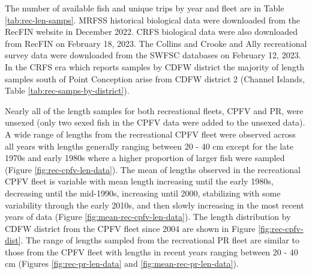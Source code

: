 \documentclass[11pt,
  english,
  letterpaper,
]{article}
\begin{document}
The number of available fish and unique trips by year and fleet are in Table \ref{tab:rec-len-samps}. MRFSS historical biological data were downloaded from the RecFIN website in December 2022. CRFS biological data were also downloaded from RecFIN on February 18, 2023. The Collins and Crooke and Ally recreational survey data were downloaded from the SWFSC databases on February 12, 2023. In the CRFS era which reports samples by CDFW district the majority of length samples south of Point Conception arise from CDFW district 2 (Channel Islands, Table \ref{tab:rec-samps-by-district}).

Nearly all of the length samples for both recreational fleets, CPFV and PR, were unsexed (only two sexed fish in the CPFV data were added to the unsexed data). A wide range of lengths from the recreational CPFV fleet were observed across all years with lengths generally ranging between 20 - 40 cm except for the late 1970s and early 1980s where a higher proportion of larger fish were sampled (Figure \ref{fig:rec-cpfv-len-data}). The mean of lengths observed in the recreational CPFV fleet is variable with mean length increasing until the early 1980s, decreasing until the mid-1990s, increasing until 2000, stabilizing with some variability through the early 2010s, and then slowly increasing in the most recent years of data (Figure \ref{fig:mean-rec-cpfv-len-data}). The length distribution by CDFW district from the CPFV fleet since 2004 are shown in Figure \ref{fig:rec-cpfv-dist}. The range of lengths sampled from the recreational PR fleet are similar to those from the CPFV fleet with lengths in recent years ranging between 20 - 40 cm (Figures \ref{fig:rec-pr-len-data} and \ref{fig:mean-rec-pr-len-data}).
\end{document}
